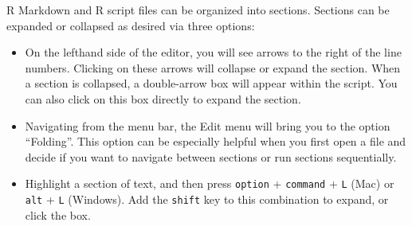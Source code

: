 \documentclass[
]{article}
\begin{document}
R Markdown and R script files can be organized into sections. Sections
can be expanded or collapsed as desired via three options:

\begin{itemize}
\item
  On the lefthand side of the editor, you will see arrows to the right
  of the line numbers. Clicking on these arrows will collapse or expand
  the section. When a section is collapsed, a double-arrow box will
  appear within the script. You can also click on this box directly to
  expand the section.
\item
  Navigating from the menu bar, the Edit menu will bring you to the
  option ``Folding''. This option can be especially helpful when you
  first open a file and decide if you want to navigate between sections
  or run sections sequentially.
\item
  Highlight a section of text, and then press \texttt{option} +
  \texttt{command} + \texttt{L} (Mac) or \texttt{alt} + \texttt{L}
  (Windows). Add the \texttt{shift} key to this combination to expand,
  or click the box.
\end{itemize}
\end{document}
